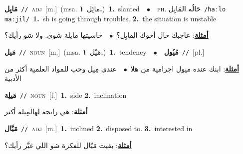 \documentclass[10pt,a4paper,twoside]{article} %
\begin{document}
\begin{multicols}{2}
{\setlength\topsep{0pt}\textbf{\foreignlanguage{arabic}{مَايِل}}\ {\color{gray}\texttt{//}\color{black}}\ \textsc{adj}\ [m.]\ \color{gray}(msa. \foreignlanguage{arabic}{مائِل}~\foreignlanguage{arabic}{\textbf{١.}})\color{black}\ \textbf{1.}~slanted\ \ $\bullet$\ \ \textsc{ph.} \color{gray} \foreignlanguage{arabic}{حَالُه المَايِل}\color{black}\ {\color{gray}\texttt{/{\sffamily ħaːlo maːjil}/}\color{black}}\ \textbf{1.}~sb is going through troubles.  \textbf{2.}~the situation is unstable\  \begin{flushright}\color{gray}\foreignlanguage{arabic}{\textbf{\underline{\foreignlanguage{arabic}{أمثلة}}}: عاجبك حال أخوك المايِل؟\ $\bullet$\ \  حاسيتها مايلة شوي. ولا شو رأيك؟}\end{flushright}\color{black}} \vspace{2mm}

{\setlength\topsep{0pt}\textbf{\foreignlanguage{arabic}{مَيل}}\ {\color{gray}\texttt{//}\color{black}}\ \textsc{noun}\ [m.]\ \color{gray}(msa. \foreignlanguage{arabic}{مَيْل}~\foreignlanguage{arabic}{\textbf{١.}})\color{black}\ \textbf{1.}~tendency\ \ $\bullet$\ \ \setlength\topsep{0pt}\textbf{\foreignlanguage{arabic}{مُيُول}}\ {\color{gray}\texttt{//}\color{black}}\ [pl.]\  \begin{flushright}\color{gray}\foreignlanguage{arabic}{\textbf{\underline{\foreignlanguage{arabic}{أمثلة}}}: ابنك عنده ميول اجرامية من هلا\ $\bullet$\ \  عندي مِيل وحب للمواد العلمية أكثر من الأدبية}\end{flushright}\color{black}} \vspace{2mm}

{\setlength\topsep{0pt}\textbf{\foreignlanguage{arabic}{مَيلِة}}\ {\color{gray}\texttt{//}\color{black}}\ \textsc{noun}\ [f.]\ \textbf{1.}~side  \textbf{2.}~inclination\  \begin{flushright}\color{gray}\foreignlanguage{arabic}{\textbf{\underline{\foreignlanguage{arabic}{أمثلة}}}: هي رايحة لهالمِيلة أكثر}\end{flushright}\color{black}} \vspace{2mm}

{\setlength\topsep{0pt}\textbf{\foreignlanguage{arabic}{مَيَّال}}\ {\color{gray}\texttt{//}\color{black}}\ \textsc{adj}\ [m.]\ \textbf{1.}~inclined  \textbf{2.}~disposed to.  \textbf{3.}~interested in\  \begin{flushright}\color{gray}\foreignlanguage{arabic}{\textbf{\underline{\foreignlanguage{arabic}{أمثلة}}}: بقيت مَيّال للفكرة شو اللي غيَّر رأيك؟}\end{flushright}\color{black}} \vspace{2mm}


\end{multicols}
\end{document}
